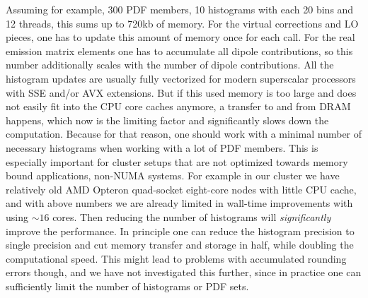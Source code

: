  Assuming for example, 300 PDF members,
10 histograms with each 20 bins and 12 threads, this sums up to {720}{kb} of memory. For the
virtual corrections and LO pieces, one has to update this amount of memory once for each call. For the real
emission matrix elements one has to accumulate all dipole contributions, so this number additionally scales
with the number of dipole contributions. All the histogram updates are usually fully vectorized for modern 
superscalar processors with SSE and/or AVX extensions. But if this used memory is too large and does not easily fit 
into the 
CPU core caches anymore, a transfer to and from DRAM happens, which now is the limiting factor and significantly slows
down the computation. Because for that reason, one should work with a minimal number of necessary histograms when 
working
with a lot of PDF members. This is especially important for cluster setups that are not optimized towards
memory bound applications, non-NUMA systems. For example in our cluster we have relatively old AMD Opteron quad-socket 
eight-core nodes with little CPU cache, and with above numbers we are already limited in wall-time improvements with 
using $\sim16$ cores. Then reducing 
the number of histograms will \emph{significantly} improve the performance. In principle one can reduce the histogram 
precision to single precision and cut memory transfer and storage in half, while doubling the computational speed. This 
might lead to problems with accumulated rounding errors though, and we have not investigated this further, since in
practice one can sufficiently limit the number of histograms or PDF sets.
